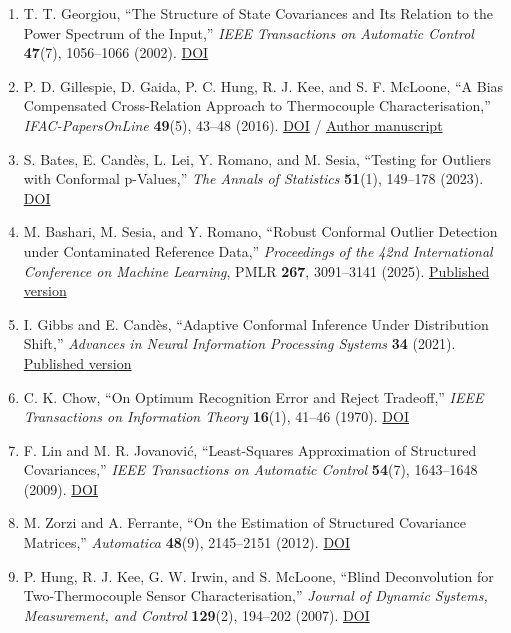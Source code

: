 \documentclass[10pt,a4paper]{article}
\begin{document}
\begin{enumerate}\setlength{\itemsep}{2pt}
\item T. T. Georgiou, “The Structure of State Covariances and Its Relation to the Power Spectrum of the Input,” \emph{IEEE Transactions on Automatic Control} \textbf{47}(7), 1056–1066 (2002). \href{https://doi.org/10.1109/TAC.2002.800643}{DOI}
\item P. D. Gillespie, D. Gaida, P. C. Hung, R. J. Kee, and S. F. McLoone, “A Bias Compensated Cross-Relation Approach to Thermocouple Characterisation,” \emph{IFAC-PapersOnLine} \textbf{49}(5), 43–48 (2016). \href{https://doi.org/10.1016/j.ifacol.2016.07.087}{DOI} / \href{https://pureadmin.qub.ac.uk/ws/portalfiles/portal/121129106/IFAC2016_v3.pdf}{Author manuscript}
\item S. Bates, E. Candès, L. Lei, Y. Romano, and M. Sesia, “Testing for Outliers with Conformal p-Values,” \emph{The Annals of Statistics} \textbf{51}(1), 149–178 (2023). \href{https://doi.org/10.1214/22-AOS2244}{DOI}
\item M. Bashari, M. Sesia, and Y. Romano, “Robust Conformal Outlier Detection under Contaminated Reference Data,” \emph{Proceedings of the 42nd International Conference on Machine Learning}, PMLR \textbf{267}, 3091–3141 (2025). \href{https://proceedings.mlr.press/v267/bashari25a.html}{Published version}
\item I. Gibbs and E. Candès, “Adaptive Conformal Inference Under Distribution Shift,” \emph{Advances in Neural Information Processing Systems} \textbf{34} (2021). \href{https://papers.neurips.cc/paper_files/paper/2021/hash/0d441de75945e5acbc865406fc9a2559-Abstract.html}{Published version}
\item C. K. Chow, “On Optimum Recognition Error and Reject Tradeoff,” \emph{IEEE Transactions on Information Theory} \textbf{16}(1), 41–46 (1970). \href{https://doi.org/10.1109/TIT.1970.1054406}{DOI}
\item F. Lin and M. R. Jovanović, “Least-Squares Approximation of Structured Covariances,” \emph{IEEE Transactions on Automatic Control} \textbf{54}(7), 1643–1648 (2009). \href{https://doi.org/10.1109/TAC.2009.2017976}{DOI}
\item M. Zorzi and A. Ferrante, “On the Estimation of Structured Covariance Matrices,” \emph{Automatica} \textbf{48}(9), 2145–2151 (2012). \href{https://doi.org/10.1016/j.automatica.2012.05.057}{DOI}
\item P. Hung, R. J. Kee, G. W. Irwin, and S. McLoone, “Blind Deconvolution for Two-Thermocouple Sensor Characterisation,” \emph{Journal of Dynamic Systems, Measurement, and Control} \textbf{129}(2), 194–202 (2007). \href{https://doi.org/10.1115/1.2431814}{DOI}

\end{enumerate}
\end{document}
